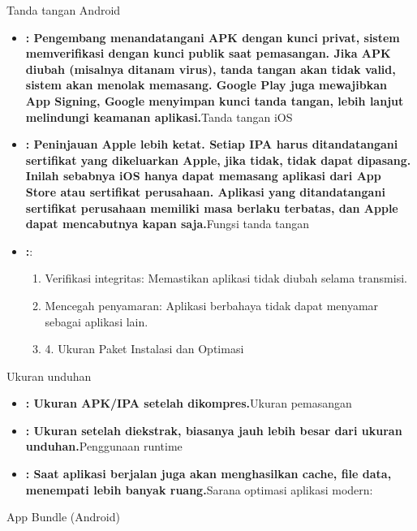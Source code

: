 
Tanda tangan Android

\begin{itemize}
  \item \textbf{: Pengembang menandatangani APK dengan kunci privat, sistem memverifikasi dengan kunci publik saat pemasangan. Jika APK diubah (misalnya ditanam virus), tanda tangan akan tidak valid, sistem akan menolak memasang. Google Play juga mewajibkan App Signing, Google menyimpan kunci tanda tangan, lebih lanjut melindungi keamanan aplikasi.}Tanda tangan iOS
  \item \textbf{: Peninjauan Apple lebih ketat. Setiap IPA harus ditandatangani sertifikat yang dikeluarkan Apple, jika tidak, tidak dapat dipasang. Inilah sebabnya iOS hanya dapat memasang aplikasi dari App Store atau sertifikat perusahaan. Aplikasi yang ditandatangani sertifikat perusahaan memiliki masa berlaku terbatas, dan Apple dapat mencabutnya kapan saja.}Fungsi tanda tangan
  \item \textbf{:}:
  \begin{enumerate}
    \item Verifikasi integritas: Memastikan aplikasi tidak diubah selama transmisi.
    \item Mencegah penyamaran: Aplikasi berbahaya tidak dapat menyamar sebagai aplikasi lain.
    \item 4. Ukuran Paket Instalasi dan Optimasi
  \end{enumerate}
\end{itemize}


Ukuran unduhan

\begin{itemize}
  \item \textbf{: Ukuran APK/IPA setelah dikompres.}Ukuran pemasangan
  \item \textbf{: Ukuran setelah diekstrak, biasanya jauh lebih besar dari ukuran unduhan.}Penggunaan runtime
  \item \textbf{: Saat aplikasi berjalan juga akan menghasilkan cache, file data, menempati lebih banyak ruang.}Sarana optimasi aplikasi modern:
\end{itemize}

App Bundle (Android)

